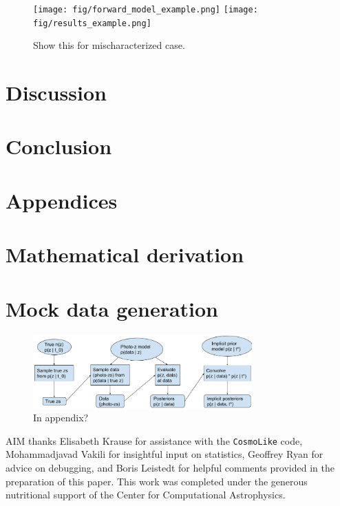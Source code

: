 \documentclass[iop]{emulateapj}
\begin{document}
\begin{figure}
	\begin{center}
		
\texttt{[image: fig/forward\_model\_example.png]}
		\texttt{[image: fig/results\_example.png]}
		\caption{Show this for mischaracterized case.}
		\label{fig:mischaracterized}
	\end{center}
\end{figure}


\section{Discussion}
\label{sec:discussion}



\section{Conclusion}
\label{sec:conclusion}

\section*{Appendices}

\begin{appendices}

\section{Mathematical derivation}
\label{app:math}

\section{Mock data generation}
\label{app:data}


\begin{figure}
	\begin{center}
		\includegraphics[width=0.75\textwidth]{fig/flowchart.png}
		\caption{In appendix?}
		\label{fig:flowchart}
	\end{center}
\end{figure}


\end{appendices}

\begin{acknowledgements}
AIM thanks Elisabeth Krause for assistance with the \texttt{CosmoLike} code, 
Mohammadjavad Vakili for insightful input on statistics, Geoffrey Ryan for 
advice on debugging, and Boris Leistedt for helpful comments provided in the 
preparation of this paper.
This work was completed under the generous nutritional support of the Center 
for Computational Astrophysics.
\end{acknowledgements}



\end{document}
